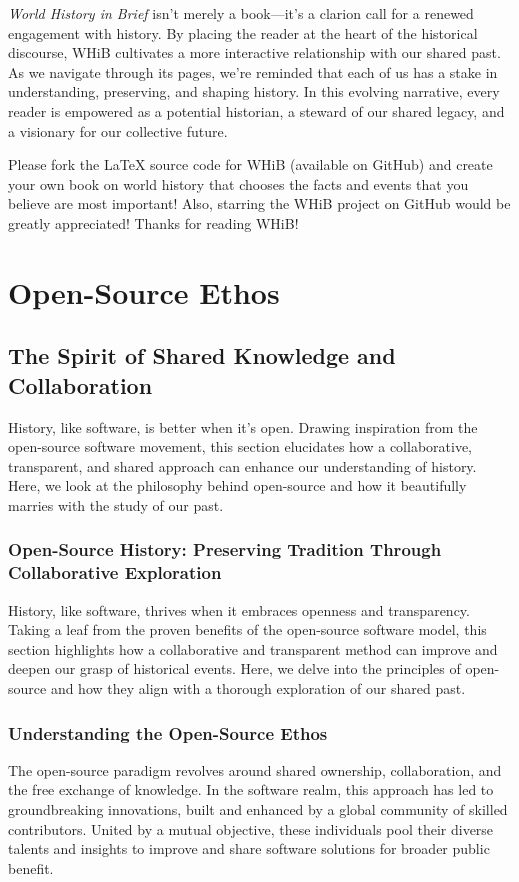 \documentclass[a4paper,12pt]{book}
\begin{document}
\emph{World History in Brief} isn't merely a book—it's a clarion call for a renewed engagement with history. By placing the reader at the heart of the historical discourse, WHiB cultivates a more interactive relationship with our shared past. As we navigate through its pages, we're reminded that each of us has a stake in understanding, preserving, and shaping history. In this evolving narrative, every reader is empowered as a potential historian, a steward of our shared legacy, and a visionary for our collective future.

\bigskip
\noindent
Please fork the \LaTeX{} source code for WHiB (available on GitHub) and create your own book on world history that chooses the facts and events that you believe are most important! Also, starring the WHiB project on GitHub would be greatly appreciated! Thanks for reading WHiB!

\chapter{Open-Source Ethos}
\section*{The Spirit of Shared Knowledge and Collaboration}
History, like software, is better when it's open. Drawing inspiration from the open-source software movement, this section elucidates how a collaborative, transparent, and shared approach can enhance our understanding of history. Here, we look at the philosophy behind open-source and how it beautifully marries with the study of our past.

\subsection*{Open-Source History: Preserving Tradition Through Collaborative Exploration}
History, like software, thrives when it embraces openness and transparency. Taking a leaf from the proven benefits of the open-source software model, this section highlights how a collaborative and transparent method can improve and deepen our grasp of historical events. Here, we delve into the principles of open-source and how they align with a thorough exploration of our shared past.

\subsection*{Understanding the Open-Source Ethos}
The open-source paradigm revolves around shared ownership, collaboration, and the free exchange of knowledge. In the software realm, this approach has led to groundbreaking innovations, built and enhanced by a global community of skilled contributors. United by a mutual objective, these individuals pool their diverse talents and insights to improve and share software solutions for broader public benefit.
\end{document}
